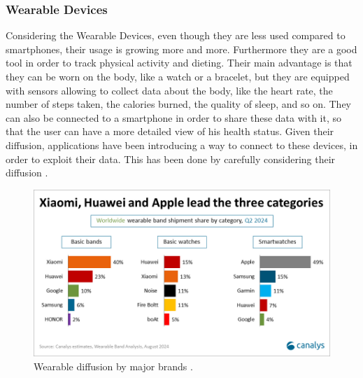 \subsubsection{Wearable Devices} %
\label{sec:wearableDevices}
Considering the Wearable Devices, even though they are less used compared to smartphones, their usage is growing more and more. Furthermore they are a good tool in order to track physical activity and dieting. Their main advantage is that they can be worn on the body, like a watch or a bracelet, but they are equipped with sensors allowing to collect data about the body, like the heart rate, the number of steps taken, the calories burned, the quality of sleep, and so on. They can also be connected to a smartphone in order to share these data with it, so that the user can have a more detailed view of his health status. Given their diffusion, applications have been introducing a way to connect to these devices, in order to exploit their data. This has been done by carefully considering their diffusion \cite{WearableDevicesBrandDiffusion}.
\begin{figure}
    \includegraphics[width=1.0\linewidth]{./images/wearable_brand_diffusion.png}
    \caption[Wearable diffusion by major brands.]{Wearable diffusion by major brands \protect\cite{WearableDevicesBrandDiffusion}.}
    \label{fig:brandDiffusion}
\end{figure}
\FloatBarrier
